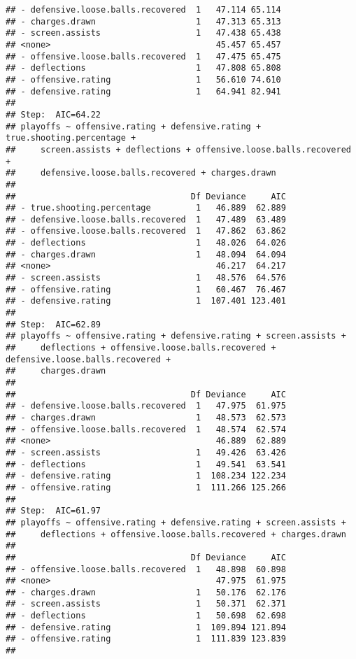 \documentclass[
]{article}
\begin{document}
\begin{verbatim}
## - defensive.loose.balls.recovered  1   47.114 65.114
## - charges.drawn                    1   47.313 65.313
## - screen.assists                   1   47.438 65.438
## <none>                                 45.457 65.457
## - offensive.loose.balls.recovered  1   47.475 65.475
## - deflections                      1   47.808 65.808
## - offensive.rating                 1   56.610 74.610
## - defensive.rating                 1   64.941 82.941
## 
## Step:  AIC=64.22
## playoffs ~ offensive.rating + defensive.rating + true.shooting.percentage + 
##     screen.assists + deflections + offensive.loose.balls.recovered + 
##     defensive.loose.balls.recovered + charges.drawn
## 
##                                   Df Deviance     AIC
## - true.shooting.percentage         1   46.889  62.889
## - defensive.loose.balls.recovered  1   47.489  63.489
## - offensive.loose.balls.recovered  1   47.862  63.862
## - deflections                      1   48.026  64.026
## - charges.drawn                    1   48.094  64.094
## <none>                                 46.217  64.217
## - screen.assists                   1   48.576  64.576
## - offensive.rating                 1   60.467  76.467
## - defensive.rating                 1  107.401 123.401
## 
## Step:  AIC=62.89
## playoffs ~ offensive.rating + defensive.rating + screen.assists + 
##     deflections + offensive.loose.balls.recovered + defensive.loose.balls.recovered + 
##     charges.drawn
## 
##                                   Df Deviance     AIC
## - defensive.loose.balls.recovered  1   47.975  61.975
## - charges.drawn                    1   48.573  62.573
## - offensive.loose.balls.recovered  1   48.574  62.574
## <none>                                 46.889  62.889
## - screen.assists                   1   49.426  63.426
## - deflections                      1   49.541  63.541
## - defensive.rating                 1  108.234 122.234
## - offensive.rating                 1  111.266 125.266
## 
## Step:  AIC=61.97
## playoffs ~ offensive.rating + defensive.rating + screen.assists + 
##     deflections + offensive.loose.balls.recovered + charges.drawn
## 
##                                   Df Deviance     AIC
## - offensive.loose.balls.recovered  1   48.898  60.898
## <none>                                 47.975  61.975
## - charges.drawn                    1   50.176  62.176
## - screen.assists                   1   50.371  62.371
## - deflections                      1   50.698  62.698
## - defensive.rating                 1  109.894 121.894
## - offensive.rating                 1  111.839 123.839
## 

\end{verbatim}
\end{document}
